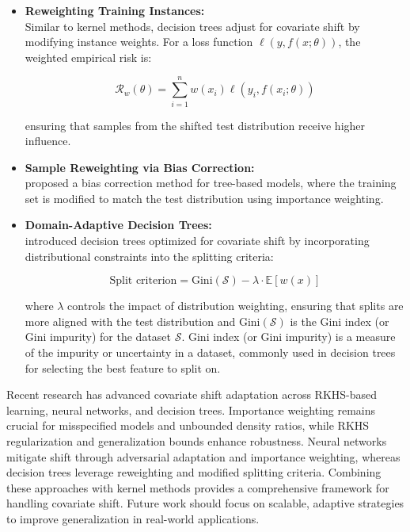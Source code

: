 \begin{itemize}
    \item \textbf{Reweighting Training Instances:}\\
    Similar to kernel methods, decision trees adjust for covariate shift by modifying instance weights. For a loss function $\ell (y, f(x; \theta))$, the weighted empirical risk is:
    
    \begin{equation}
        \mathcal{R}_w(\theta) = \sum_{i=1}^n w(x_i) \ell(y_i, f(x_i; \theta))
        \label{eqn:5.9}
    \end{equation}
    
    ensuring that samples from the shifted test distribution receive higher influence.
    
    \item \textbf{Sample Reweighting via Bias Correction:}\\
    \citep{sugiyama2000covariate} proposed a bias correction method for tree-based models, where the training set is modified to match the test distribution using importance weighting.

    \item \textbf{Domain-Adaptive Decision Trees:}\\
    \citep{zhao2021domain} introduced decision trees optimized for covariate shift by incorporating distributional constraints into the splitting criteria:

    \begin{equation}
        \text{Split criterion} = \text{Gini}(\mathcal{S}) - \lambda \cdot \mathbb{E}[w(x)]
        \label{eqn:5.10}
    \end{equation}

    where $\lambda$ controls the impact of distribution weighting, ensuring that splits are more aligned with the test distribution and $\text{Gini}(\mathcal{S})$ is the Gini index (or Gini impurity) for the dataset $\mathcal{S}$. Gini index (or Gini impurity) is a measure of the impurity or uncertainty in a dataset, commonly used in decision trees for selecting the best feature to split on.
\end{itemize}

Recent research has advanced covariate shift adaptation across RKHS-based learning, neural networks, and decision trees. Importance weighting remains crucial for misspecified models and unbounded density ratios, while RKHS regularization and generalization bounds enhance robustness. Neural networks mitigate shift through adversarial adaptation and importance weighting, whereas decision trees leverage reweighting and modified splitting criteria. Combining these approaches with kernel methods provides a comprehensive framework for handling covariate shift. Future work should focus on scalable, adaptive strategies to improve generalization in real-world applications.







